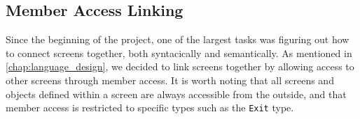\subsection*{Member Access Linking} \label{sec:Linker}
Since the beginning of the project, one of the largest tasks was figuring out how to connect screens together, both syntacically and semantically. 
As mentioned in \ref{chap:language_design}, we decided to link screens together by allowing access to other screens through member access. 
It is worth noting that all screens and objects defined within a screen are always accessible from the outside, and that member access is restricted to specific types such as the \texttt{Exit} type.